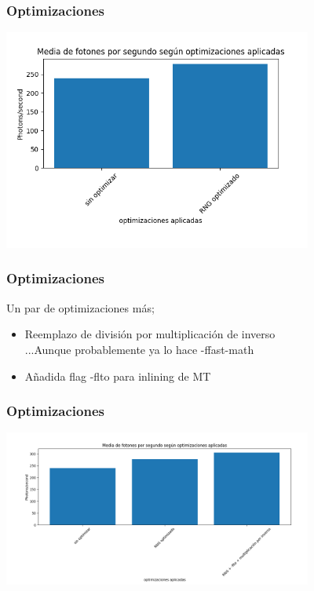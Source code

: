 \documentclass{beamer}
\begin{document}
\begin{frame}
    \frametitle{Optimizaciones}
    \includegraphics[width=4in]{imagenes/optimizacion_1.png}

\end{frame}

\begin{frame}
    \frametitle{Optimizaciones}
    Un par de optimizaciones más; \\\pause
    \begin{itemize}
        \item<1-> Reemplazo de división por multiplicación de inverso \\\pause
        ...Aunque probablemente ya lo hace -ffast-math \\\pause
        \item<2-> Añadida flag -flto para inlining de MT
       \end{itemize}
       
\end{frame}

\begin{frame}
    \frametitle{Optimizaciones}
    \includegraphics[width=4in]{imagenes/optimizacion_2.png}
\end{frame}
\end{document}
